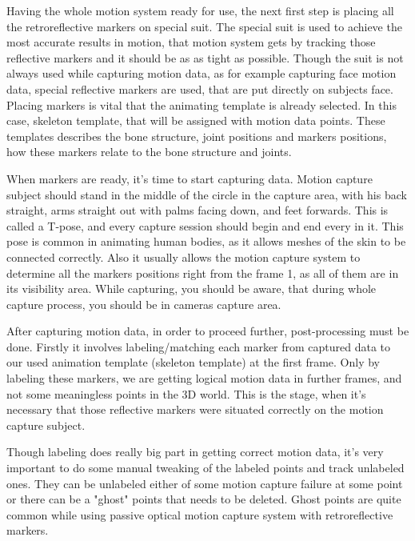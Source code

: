 
Having the whole motion system ready for use, the next first step is placing all the retroreflective markers on special suit.
The special suit is used to achieve the most accurate results in motion, that motion system gets by tracking those reflective markers and it should be as as tight as possible. Though the suit is not always used while capturing motion data, as for example capturing face motion data, special reflective markers are used, that are put directly on subjects face. Placing markers is vital that the animating template is already selected. In this case, skeleton template, that will be assigned with motion data points. These templates describes the bone structure, joint positions and markers positions, how these markers relate to the bone structure and joints.

When markers are ready, it's time to start capturing data. Motion capture subject should stand in the middle of the circle in the capture area, with his back straight, arms straight out with palms facing down, and feet forwards.
This is called a T-pose, and every capture session should begin and end every in it. This pose is common in animating human bodies, as it allows meshes of the skin to be connected correctly. Also it usually allows the motion capture system to determine all the markers positions right from the frame 1, as all of them are in its visibility area.
While capturing, you should be aware, that during whole capture process, you should be in cameras capture area.


After capturing motion data, in order to proceed further, post-processing must be done.
Firstly it involves labeling/matching each marker from captured data to our used animation template (skeleton template) at the first frame.
Only by labeling these markers, we are getting logical motion data in further frames, and not some meaningless points in the 3D world. This is the stage, when it's necessary that those reflective markers were situated correctly on the motion capture subject.

Though labeling does really big part in getting correct motion data, it's very important to do some manual tweaking of the labeled points and track unlabeled ones. They can be unlabeled either of some motion capture failure at some point or there can be a "ghost" points that needs to be deleted. Ghost points are quite common while using passive optical motion capture system with retroreflective markers.

